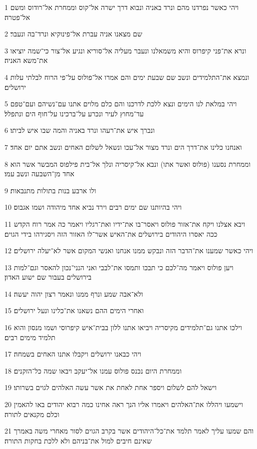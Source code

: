\par 1 ויהי כאשר נפרדנו מהם ונרד באניה ונבוא דרך ישרה אל־קוס וממחרת אל־רודוס ומשם אל־פטרה׃
\par 2 שם מצאנו אניה עברת אל־פינוקיא ונרד־בה ונעבר׃
\par 3 ונרא את־פני קיפרוס והיא משמאלנו ונעבר מעליה אל־סוריא ונגיע אל־צור כי־שמה יוציאו את־משא האניה׃
\par 4 ונמצא את־התלמידים ונשב שם שבעת ימים והם אמרו אל־פולוס על־פי הרוח לבלתי עלות ירושלים׃
\par 5 ויהי במלאת לנו הימים ונצא ללכת לדרכנו והם כלם מלוים אתנו עם־נשיהם ועם־טפם עד־מחוץ לעיר ונכרע על־ברכינו על־חוף הים ונתפלל׃
\par 6 ונברך איש את־רעהו ונרד באניה והמה שבו איש לביתו׃
\par 7 ואנחנו כלינו את־דרך הים ונרד מצור אל־עכו ונשאל לשלום האחים ונשב אתם יום אחד׃
\par 8 וממחרת נסענו (פולוס ואשר אתו) ונבא אל־קיסריה ונלך אל־בית פילפוס המבשר אשר הוא אחד מן־השבעה ונשב עמו׃
\par 9 ולו ארבע בנות בתולות מתנבאות׃
\par 10 ויהי בהיותנו שם ימים רבים וירד נביא אחד מיהודה ושמו אגבוס׃
\par 11 ויבא אצלנו ויקח את־אזור פולוס ויאסר־בו את־ידיו ואת־רגליו ויאמר כה אמר רוח הקדש ככה יאסרו היהודים בירושלים את־האיש אשר־לו האזור הזה ויסגירהו בידי הגוים׃
\par 12 ויהי כאשר שמענו את־הדבר הזה ונבקש ממנו אנחנו ואנשי המקום אשר לא־יעלה ירושלים׃
\par 13 ויען פולוס ויאמר מה־לכם כי תבכו ותמסו את־לבבי ואני הנני־נכון להאסר וגם־למות בירושלים בעבור שם ישוע האדון׃
\par 14 ולא־אבה שמע ונרף ממנו ונאמר רצון יהוה יעשה׃
\par 15 ואחרי הימים ההם נשאנו את־כלינו ונעל ירושלים׃
\par 16 וילכו אתנו גם־תלמידים מקיסריה ויביאו אתנו ללון בבית־איש קיפרוסי ושמו מנסון והוא תלמיד מימים רבים׃
\par 17 ויהי כבאנו ירושלים ויקבלו אתנו האחים בשמחה׃
\par 18 וממחרת היום נכנס פולוס עמנו אל־יעקב ויבאו שמה כל־הזקנים׃
\par 19 וישאל להם לשלום ויספר אחת לאחת את אשר עשה האלהים לגוים בשרותו׃
\par 20 וישמעו ויהללו את־האלהים ויאמרו אליו הנך ראה אחינו כמה רבוא יהודים באו להאמין וכלם מקנאים לתורה׃
\par 21 והם שמעו עליך לאמר תלמד את־כל־היהודים אשר בקרב הגוים לסור מאחרי משה באמרך שאינם חיבים למול את־בניהם ולא ללכת בחקות התורה׃
